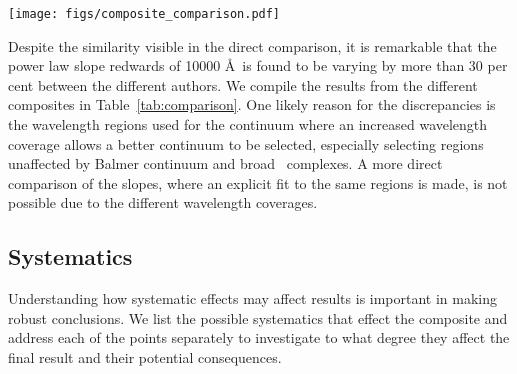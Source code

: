 \documentclass{aa}    %
\newcommand{\figlabel}[1]{\label{fig:#1}}
\newcommand{\Tab}[1]{Table~\ref{tab:#1}}
\newcommand{\tab}[1]{\Tab{#1}}
\newcommand{\sectlabel}[1]{\label{sect:#1}}
\newcommand{\lya}{Ly$\alpha$}
\newcommand{\feii}{\ion{Fe}{ii}}
\begin{document}
 \begin{figure*}[t!]
   \centering
   \texttt{[image: figs/composite\_comparison.pdf]}
   \caption[]{Comparison of different composites. The composites by
     \citet{Lusso2015, VandenBerk2001, Telfer2002, Francis1991} are
     normalized to the X-shooter composite at $\sim 1450$ \AA~and the
     composite by \citet{Glikman2006} is normalized to ours at $\sim
     3850$ \AA. Significant differences are visible blueward of
     \lya~due to differing IGM correction methods. Above 5000 \AA~
     significant host galaxy contamination is visible in the composite
     by \citet{VandenBerk2001}. Overplot in blue is a pure power law
     with slope $\alpha = -1.7$ and normalized at $\sim 1450$ \AA.}
   \figlabel{composite_comparison}
 \end{figure*}
  
 
Despite the similarity visible in the direct comparison, it is
remarkable that the power law slope redwards of 10000 \AA~is found to
be varying by more than 30 per cent between the different authors. We
compile the results from the different composites in
\tab{comparison}. One likely reason for the discrepancies is the
wavelength regions used for the continuum where an increased
wavelength coverage allows a better continuum to be selected,
especially selecting regions unaffected by Balmer continuum and broad
\feii~complexes. A more direct comparison of the slopes, where an
explicit fit to the same regions is made, is not possible due to the
different wavelength coverages.





\subsection{Systematics}  \sectlabel{systematics}

Understanding how systematic effects may affect results is important in making
robust conclusions.
 We list the possible systematics that effect the composite and address each of
the points separately to investigate to what degree they affect the final result
and their potential consequences.
\end{document}

